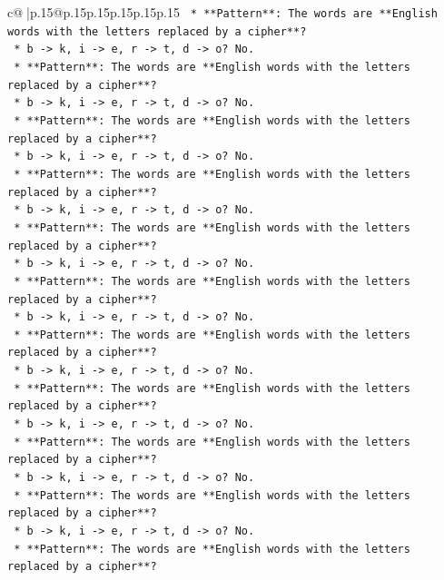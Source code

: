 \documentclass{article}
\begin{document}
{\begin{supertabular}{c@{$\;$}|p{.15\linewidth}@{}p{.15\linewidth}p{.15\linewidth}p{.15\linewidth}p{.15\linewidth}p{.15\linewidth}}
{{{\texttt{    *   **Pattern**: The words are **English words with the letters replaced by a cipher**?} \\
\texttt{    *   b {-}> k, i {-}> e, r {-}> t, d {-}> o? No.} \\
\texttt{    *   **Pattern**: The words are **English words with the letters replaced by a cipher**?} \\
\texttt{    *   b {-}> k, i {-}> e, r {-}> t, d {-}> o? No.} \\
\texttt{    *   **Pattern**: The words are **English words with the letters replaced by a cipher**?} \\
\texttt{    *   b {-}> k, i {-}> e, r {-}> t, d {-}> o? No.} \\
\texttt{    *   **Pattern**: The words are **English words with the letters replaced by a cipher**?} \\
\texttt{    *   b {-}> k, i {-}> e, r {-}> t, d {-}> o? No.} \\
\texttt{    *   **Pattern**: The words are **English words with the letters replaced by a cipher**?} \\
\texttt{    *   b {-}> k, i {-}> e, r {-}> t, d {-}> o? No.} \\
\texttt{    *   **Pattern**: The words are **English words with the letters replaced by a cipher**?} \\
\texttt{    *   b {-}> k, i {-}> e, r {-}> t, d {-}> o? No.} \\
\texttt{    *   **Pattern**: The words are **English words with the letters replaced by a cipher**?} \\
\texttt{    *   b {-}> k, i {-}> e, r {-}> t, d {-}> o? No.} \\
\texttt{    *   **Pattern**: The words are **English words with the letters replaced by a cipher**?} \\
\texttt{    *   b {-}> k, i {-}> e, r {-}> t, d {-}> o? No.} \\
\texttt{    *   **Pattern**: The words are **English words with the letters replaced by a cipher**?} \\
\texttt{    *   b {-}> k, i {-}> e, r {-}> t, d {-}> o? No.} \\
\texttt{    *   **Pattern**: The words are **English words with the letters replaced by a cipher**?} \\
\texttt{    *   b {-}> k, i {-}> e, r {-}> t, d {-}> o? No.} \\
\texttt{    *   **Pattern**: The words are **English words with the letters replaced by a cipher**?} \\
}}}
\end{supertabular}}
\end{document}
